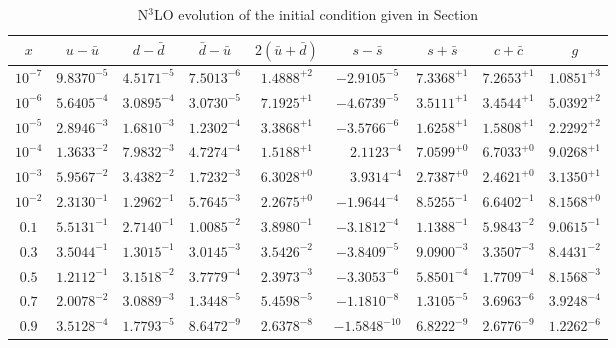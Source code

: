 \begin{table}
  \small \centering
  \begin{tabular}{c|cccccccc}
    $x$ &  $u-\bar u$ &$d-\bar d$ &$\bar d-\bar u$ &  $ 2(\bar u+\bar d)$  &$s-\bar s$ &$s+\bar s$&$c+\bar c$ &   $g$\\
    \toprule
$10^{-7}$ &  $9.8370^{-5}$ &  $4.5171^{-5}$ &  $7.5013^{-6}$ &  $1.4888^{+2}$ &  $-2.9105^{-5}$ &             $7.3368^{+1}$ &  $7.2653^{+1}$ &  $1.0851^{+3}$ \\
$10^{-6}$ &  $5.6405^{-4}$ &  $3.0895^{-4}$ &  $3.0730^{-5}$ &  $7.1925^{+1}$ &  $-4.6739^{-5}$ &             $3.5111^{+1}$ &  $3.4544^{+1}$ &  $5.0392^{+2}$ \\
$10^{-5}$ &  $2.8946^{-3}$ &  $1.6810^{-3}$ &  $1.2302^{-4}$ &  $3.3868^{+1}$ &  $-3.5766^{-6}$ &             $1.6258^{+1}$ &  $1.5808^{+1}$ &  $2.2292^{+2}$ \\
$10^{-4}$ &  $1.3633^{-2}$ &  $7.9832^{-3}$ &  $4.7274^{-4}$ &  $1.5188^{+1}$ &  $\phantom{-}2.1123^{-4}$ &   $7.0599^{+0}$ &  $6.7033^{+0}$ &  $9.0268^{+1}$ \\
$10^{-3}$ &  $5.9567^{-2}$ &  $3.4382^{-2}$ &  $1.7232^{-3}$ &  $6.3028^{+0}$ &  $\phantom{-}3.9314^{-4}$ &   $2.7387^{+0}$ &  $2.4621^{+0}$ &  $3.1350^{+1}$ \\
$10^{-2}$ &  $2.3130^{-1}$ &  $1.2962^{-1}$ &  $5.7645^{-3}$ &  $2.2675^{+0}$ &  $-1.9644^{-4}$ &             $8.5255^{-1}$ &  $6.6402^{-1}$ &  $8.1568^{+0}$ \\
$0.1$    &  $5.5131^{-1}$ &  $2.7140^{-1}$ &  $1.0085^{-2}$ &  $3.8980^{-1}$ &  $-3.1812^{-4}$ &             $1.1388^{-1}$ &  $5.9843^{-2}$ &  $9.0615^{-1}$ \\
$0.3$    &  $3.5044^{-1}$ &  $1.3015^{-1}$ &  $3.0145^{-3}$ &  $3.5426^{-2}$ &  $-3.8409^{-5}$ &             $9.0900^{-3}$ &  $3.3507^{-3}$ &  $8.4431^{-2}$ \\
$0.5$    &  $1.2112^{-1}$ &  $3.1518^{-2}$ &  $3.7779^{-4}$ &  $2.3973^{-3}$ &  $-3.3053^{-6}$ &             $5.8501^{-4}$ &  $1.7709^{-4}$ &  $8.1568^{-3}$ \\
$0.7$    &  $2.0078^{-2}$ &  $3.0889^{-3}$ &  $1.3448^{-5}$ &  $5.4598^{-5}$ &  $-1.1810^{-8}$ &             $1.3105^{-5}$ &  $3.6963^{-6}$ &  $3.9248^{-4}$ \\
$0.9$    &  $3.5128^{-4}$ &  $1.7793^{-5}$ &  $8.6472^{-9}$ &  $2.6378^{-8}$ &  $-1.5848^{-10}$ &            $6.8222^{-9}$ &  $2.6776^{-9}$ &  $1.2262^{-6}$ 
  \end{tabular}
  \caption{N$^3$LO evolution of the initial condition given in Section
}
\end{table}
